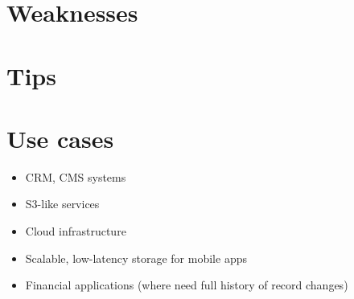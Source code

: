 \section{Weaknesses}

\section{Tips}

\section{Use cases}

\begin{itemize}
  \item CRM, CMS systems
  \item S3-like services
  \item Cloud infrastructure
  \item Scalable, low-latency storage for mobile apps
  \item Financial applications (where need full history of record changes)
\end{itemize}